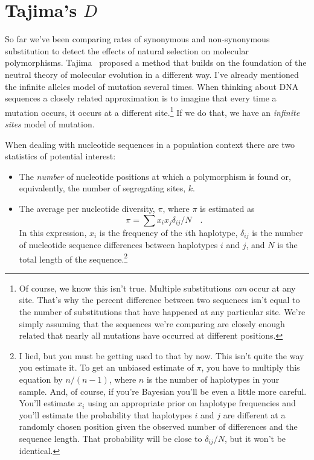 \section*{Tajima's $D$}

So far we've been comparing rates of synonymous and non-synonymous
substitution to detect the effects of natural selection on molecular
polymorphisms. Tajima~\cite{Tajima89} proposed a method that builds on
the foundation of the neutral theory of molecular evolution in a
different way. I've already mentioned the infinite alleles model of
mutation several times. When thinking about DNA sequences a closely
related approximation is to imagine that every time a mutation occurs,
it occurs at a different site.\footnote{Of course, we know this isn't
  true. Multiple substitutions {\it can\/} occur at any site. That's
  why the percent difference between two sequences isn't equal to the
  number of substitutions that have happened at any particular
  site. We're simply assuming that the sequences we're comparing are
  closely enough related that nearly all mutations have occurred at
  different positions.} If we do that, we have an {\it infinite
  sites\/} model of mutation.

When dealing with nucleotide sequences in a population context there
are two statistics of potential interest:

\begin{itemize}

\item The {\it number\/} of nucleotide positions at which a
  polymorphism is found or, equivalently, the number of segregating
  sites, $k$.

\item The average per nucleotide diversity, $\pi$, where $\pi$ is
  estimated as
\[
\pi = \sum x_ix_j\delta_{ij}/N \quad .
\]
In this expression, $x_i$ is the frequency of the $i$th haplotype,
$\delta_{ij}$ is the number of nucleotide sequence differences between
haplotypes $i$ and $j$, and $N$ is the total length of the
sequence.\footnote{I lied, but you must be getting used to that by
  now. This isn't quite the way you estimate it. To get an unbiased
  estimate of $\pi$, you have to multiply this equation by $n/(n-1)$,
  where $n$ is the number of haplotypes in your sample. And, of
  course, if you're Bayesian you'll be even a little more
  careful. You'll estimate $x_i$ using an appropriate prior on
  haplotype frequencies and you'll estimate the probability that
  haplotypes $i$ and $j$ are different at a randomly chosen position
  given the observed number of differences and the sequence
  length. That probability will be close to $\delta_{ij}/N$, but it
  won't be identical.}

\end{itemize}


